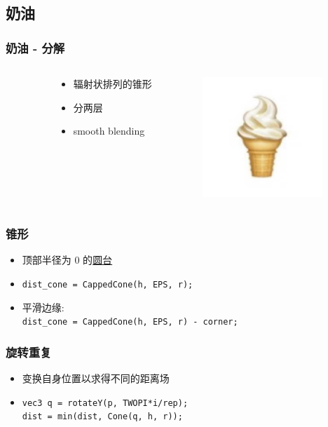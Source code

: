 \documentclass[aspectratio=169]{ctexbeamer} %
\begin{document}
\subsection{奶油}
\begin{frame}
    \frametitle{奶油 - 分解} %
    \begin{columns}
    \begin{column}{.1\textwidth}\end{column}
        \begin{column}{.4\textwidth}
            \begin{itemize}
                \item 辐射状排列的锥形
                \item 分两层
                \item smooth blending %
            \end{itemize}
        \end{column}
        \begin{column}{.5\textwidth}
            \includegraphics[width=128pt]{images/pre/emoji.pdf}
        \end{column}
    \end{columns}
\end{frame}
\begin{frame}
    \frametitle{锥形}
    \begin{itemize}[<+->]
        \item 顶部半径为 0 的\underline{圆台}
        \item \texttt{dist\_cone = CappedCone(h, EPS, r);}
        \item 平滑边缘: \\
        \texttt{dist\_cone = CappedCone(h, EPS, r) - corner;}
    \end{itemize}
\end{frame}
\begin{frame}
    \frametitle{旋转重复}
    \begin{itemize}[<+->]
        \item 变换自身位置以求得不同的距离场
        \item \texttt{vec3 q = rotateY(p, TWOPI*i/rep);} \\ 
        \texttt{dist = min(dist, Cone(q, h, r));}
    \end{itemize}
\end{frame}
\end{document}
